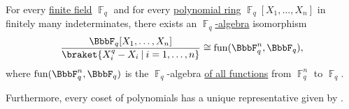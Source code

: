 \begin{proposition}\label{thm:functions_over_finite_fields}
  For every \hyperref[thm:finite_fields]{finite field} \hyperref[thm:ring_of_integers_modulo]{\( \BbbF_q \)} and for every \hyperref[def:polynomial_semiring]{polynomial ring} \( \BbbF_q[X_1, \ldots, X_n] \) in finitely many indeterminates, there exists an \hyperref[def:algebra_over_ring]{\( \BbbF_q \)-algebra} isomorphism
  \begin{equation*}
    \frac {\BbbF_q[X_1, \ldots, X_n]} {\braket{ X_i^q - X_i \given i = 1, \ldots, n }} \cong \fun(\BbbF_q^n, \BbbF_q),
  \end{equation*}
  where \( \fun(\BbbF_q^n, \BbbF_q) \) is the \( \BbbF_q \)-algebra \hyperref[thm:functions_over_semimodule]{of all functions} from \( \BbbF
  _q^n \) to \( \BbbF_q \).

  Furthermore, every coset of polynomials has a unique representative given by .
\end{proposition}
